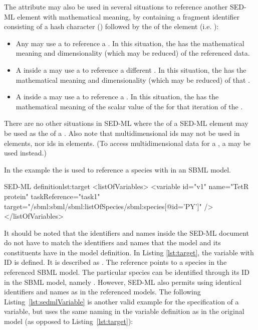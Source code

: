\begin{blockChanged}
The  attribute may also be used in several situations to reference another SED-ML element with mathematical meaning, by containing a fragment identifier consisting of a hash character (\code{\#}) followed by the \SId of the element (i.e. ):

\begin{itemize}
        \item Any \Variable may use a  to reference a \DataSource.  In this situation, the \Variable has the mathematical meaning and dimensionality (which may be reduced) of the referenced data.

        \item A \Variable inside a \DataGenerator may use a  to reference a different \DataGenerator.  In this situation, the \Variable has the mathematical meaning and dimensionality (which may be reduced) of that \DataGenerator.

        \item A \Variable inside a \RepeatedTask may use a  to reference a \Range.  In this situation, the \Variable has the mathematical meaning of the scalar value of the \Range for that iteration of the \RepeatedTask.
\end{itemize}

There are no other situations in SED-ML where the  of a SED-ML element may be used as the  of a \Variable.  Also note that multidimensional \DataSource ids may not be used in \RepeatedTask elements, nor \Range ids in \DataGenerator elements.  (To access multidimensional data for a \Range, a \DataRange may be used instead.)
\end{blockChanged}

In the example the  is used to reference a species with  in an SBML model.
\begin{myXmlLst}{SED-ML  definition}{lst:target}
<listOfVariables>
	<variable id="v1" name="TetR protein" taskReference="task1" 
		target="/sbml:sbml/sbml:listOfSpecies/sbml:species[@id='PY']" />
</listOfVariables>
\end{myXmlLst}

It should be noted that the identifiers and names inside the SED-ML document do not have to match the identifiers and names that the model and its constituents have in the model definition. In Listing \ref{lst:target}, the variable with ID  is defined. It is described as . The reference points to a species in the referenced SBML model. The particular species can be identified through its ID in the SBML model, namely . However, SED-ML also permits using identical identifiers and names as in the referenced models. The following Listing~\vref{lst:sedmlVariable} is another valid example for the specification of a variable, but uses the same naming in the variable definition as in the original model (as opposed to Listing~\ref{lst:target}):

